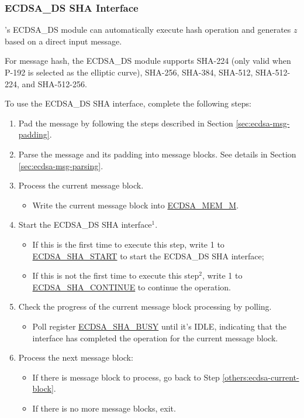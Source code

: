 \documentclass[main\_\_EN.tex]{subfiles}
\begin{document}
\subsubsection{ECDSA\_DS SHA Interface}
\label{sec:ecdsa-sha-interface}

\chipseries{}'s ECDSA\_DS module can automatically execute hash operation and generates $z$ based on a direct input message.

For message hash, the ECDSA\_DS module supports SHA-224 (only valid when P-192 is selected as the elliptic curve), SHA-256, SHA-384, SHA-512, SHA-512-224, and SHA-512-256.

To use the ECDSA\_DS SHA interface, complete the following steps:

\begin{enumerate}
	\item Pad the message by following the steps described in Section \ref{sec:ecdsa-msg-padding}.
	\item Parse the message and its padding into message blocks. See details in Section \ref{sec:ecdsa-msg-parsing}.
	\item \label{others:ecdsa-current-block} Process the current message block.
	      \begin{itemize}
		      \item Write the current message block into \hyperref[tab:ecdsa-memory]{ECDSA\_MEM\_M}.
	      \end{itemize}
	\item Start the ECDSA\_DS SHA interface\hyperref[others:ecdsa-note-sha]{$^1$}.
	      \begin{itemize}
		      \item If this is the first time to execute this step, write 1 to \hyperref[fielddesc:ECDSASHASTART]{ECDSA\_SHA\_START} to start the ECDSA\_DS SHA interface;
		      \item If this is not the first time to execute this step\hyperref[others:ecdsa-note-sha]{$^2$}, write 1 to \hyperref[fielddesc:ECDSASHACONTINUE]{ECDSA\_SHA\_CONTINUE} to continue the operation.
	      \end{itemize}
	\item Check the progress of the current message block processing by polling.
	      \begin{itemize}
		      \item Poll register \hyperref[fielddesc:ECDSASHABUSY]{ECDSA\_SHA\_BUSY} until it's IDLE, indicating that the interface has completed the operation for the current message block.
	      \end{itemize}

	\item Process the next message block:
	      \begin{itemize}
		      \item If there is message block to process, go back to Step \ref{others:ecdsa-current-block}.
		      \item If there is no more message blocks, exit.
	      \end{itemize}

\end{enumerate}
\end{document}
